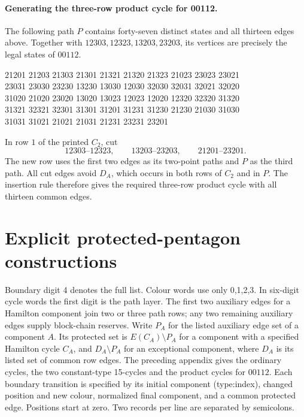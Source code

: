 \paragraph{Generating the three-row product cycle for 00112.}
The following path $P$ contains forty-seven distinct states and
all thirteen edges above. Together with $12303,12323,13203,23203$,
its vertices are precisely the legal states of $00112$.
\begingroup\small\ttfamily\begin{flushleft}
21201 21203 21303 21301 21321 21320 21323 21023 23023 23021\\
23031 23030 23230 13230 13030 12030 32030 32031 32021 32020\\
31020 21020 23020 13020 13023 12023 12020 12320 32320 31320\\
31321 32321 32301 31301 31201 31231 31230 21230 21030 31030\\
31031 31021 21021 21031 21231 23231 23201
\end{flushleft}\endgroup
In row $1$ of the printed $C_2$, cut
\[
12303\text{--}12323,\qquad13203\text{--}23203,\qquad
21201\text{--}23201.
\]
The new row uses the first two edges as its two-point paths and
$P$ as the third path. All cut edges avoid $D_A$, which occurs
in both rows of $C_2$ and in $P$. The insertion rule therefore
gives the required three-row product cycle with all thirteen common edges.


\section{Explicit protected-pentagon constructions}
\label{app:protected-pentagon-words}
Boundary digit 4 denotes the full list. Colour words use only 0,1,2,3.
In six-digit cycle words the first digit is the path layer.
The first two auxiliary edges for a Hamilton component join two or three
path rows; any two remaining auxiliary edges supply block-chain reserves.
Write $P_A$ for the listed auxiliary edge set of a component $A$.
Its protected set is $E(C_A)\setminus P_A$ for a component with a
specified Hamilton cycle $C_A$, and $D_A\setminus P_A$ for an
exceptional component, where $D_A$ is its listed set of common row edges.
The preceding appendix gives the ordinary cycles, the two constant-type
15-cycles and the product cycles for $00112$.
Each boundary transition is specified by its initial component
(type:index), changed position and new colour, normalized final
component, and a common protected edge.
Positions start at zero. Two records per line are separated by semicolons.
